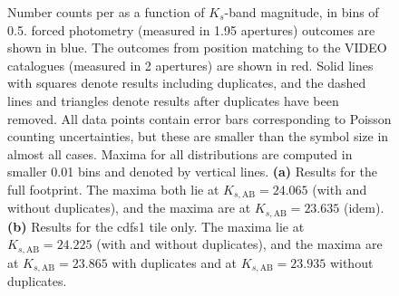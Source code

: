 \begin{figure}[tpb]
\centering
{}
\caption[Number counts in the \texorpdfstring{$K_{s}$}{}-band]{ Number counts per \si{\sqdeg} as a function of $K_{s}$-band magnitude, in bins of \SI{0.5}{\mag}. \DESVIDEO forced photometry (measured in \SI{1.95}{\arcsec} apertures) outcomes are shown in blue. The outcomes from position matching to the \cite{2013MNRAS.428.1281J} VIDEO catalogues (measured in \SI{2}{\arcsec} apertures) are shown in red. Solid lines with squares denote results including duplicates, and the dashed lines and triangles denote results after duplicates have been removed. All data points contain error bars corresponding to Poisson counting uncertainties, but these are smaller than the symbol size in almost all cases. Maxima for all distributions are computed in smaller \SI{0.01}{\mag} bins and denoted by vertical lines. \textbf{(a)} Results for the full \DESVIDEO footprint. The \DESVIDEO maxima both lie at $K_{s,\mathrm{AB}} = 24.065$ (with and without duplicates), and the \cite{2013MNRAS.428.1281J} maxima are at $K_{s,\mathrm{AB}} = 23.635$ (idem). \textbf{(b)} Results for the cdfs1 tile only. The \DESVIDEO maxima lie at $K_{s,\mathrm{AB}} = 24.225$ (with and without duplicates), and the \cite{2013MNRAS.428.1281J} maxima are at $K_{s,\mathrm{AB}} = 23.865$ with duplicates and at $K_{s,\mathrm{AB}} = 23.935$ without duplicates.}
\label{fig:number_counts_Ks}
\end{figure} 

